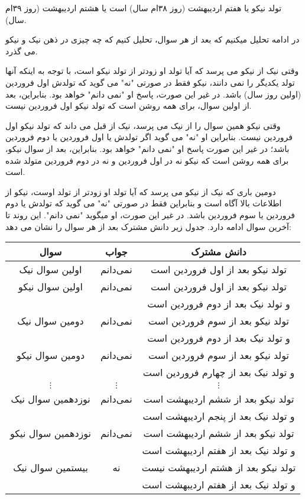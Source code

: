 \begin{solution}
تولد نیکو  یا هفتم اردیبهشت (روز ۳۸ام سال) است یا هشتم اردیبهشت (روز ۳۹ام سال).

در ادامه تحلیل میکنیم که بعد از هر سوال، تحلیل کنیم که چه چیزی در ذهن نیک و نیکو می گذرد.

وقتی نیک از نیکو می پرسد که آیا تولد او زودتر از تولد نیکو است، با توجه به اینکه آنها تولد یکدیگر را نمی دانند، نیکو فقط در صورتی "نه" می گوید که تولدش اول فروردین (اولین روز سال) باشد. در غیر این صورت، پاسخ او "نمی دانم" خواهد بود. بنابراین، بعد از اولین سوال، برای همه روشن است که تولد نیکو اول فروردین نیست.

وقتی نیکو همین سوال را از نیک می پرسد، نیک از قبل می داند که تولد نیکو اول فروردین نیست. بنابراین او "نه" می گوید اگر تولدش یا اول فروردین یا دوم فروردین باشد؛ در غیر این صورت پاسخ او "نمی دانم" خواهد بود. بنابراین، بعد از سوال نیکو، برای همه روشن است که نیکو نه در اول فروردین و نه در دوم فروردین متولد شده است.

دومین باری که نیک از نیکو می پرسد که آیا تولد او زودتر از تولد اوست، نیکو از اطلاعات بالا آگاه است و بنابراین فقط در صورتی "نه" می گوید  که تولدش یا دوم فروردین یا سوم فروردین باشد. در غیر این صورت، او میگوید "نمی دانم". این روند تا آخرین سوال ادامه دارد. جدول زیر دانش مشترک بعد از هر سوال را نشان می دهد:

\begin{center}
	\begin{tabular}{|c|c|c|}
		\hline
		سوال & جواب & دانش مشترک \\
		\hline
		اولین سوال نیک & نمی‌دانم & تولد نیکو بعد از اول فروردین است \\
		\hline 
		اولین سوال نیکو & نمی‌دانم & تولد نیکو بعد از اول فروردین است \\
		& & و تولد نیک بعد از دوم فروردین است \\
		\hline
		دومین سوال نیک & نمی‌دانم & تولد نیکو بعد از سوم فروردین است \\
		& & و تولد نیک بعد از دوم فروردین است \\
		\hline
		دومین سوال نیکو & نمی‌دانم & تولد نیکو بعد از سوم فروردین است \\
		& & و تولد نیک بعد از چهارم فروردین است \\
		\hline
		$\vdots$ & $\vdots$ & $\vdots$ \\
		\hline
		نوزدهمین سوال نیک & نمی‌دانم & تولد نیکو بعد از ششم اردیبهشت است \\
		& & و تولد نیک بعد از پنجم اردیبهشت است \\
		\hline
		نوزدهمین سوال نیکو & نمی‌دانم & تولد نیکو بعد از ششم اردیبهشت است \\
		& & و تولد نیک بعد از هفتم اردیبهشت است \\
		\hline
		بیستمین سوال نیک & نه & تولد نیکو بعد از هشتم اردیبهشت نیست \\
		& & و تولد نیک بعد از هفتم اردیبهشت است \\
		\hline
	\end{tabular}
\end{center}

\end{solution}

